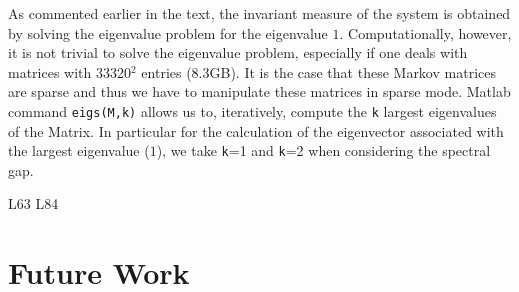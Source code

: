 As commented earlier in the text, the invariant measure of the system is obtained by solving the eigenvalue problem for the eigenvalue $1$. Computationally, however, it is not trivial to solve the eigenvalue problem, especially if one deals with matrices with 33320$^2$ entries (8.3GB). It is the case that these Markov matrices are sparse and thus we have to manipulate these matrices in sparse mode. Matlab command \texttt{eigs(M,k)} allows us to, iteratively, compute the \texttt{k} largest eigenvalues of the Matrix. In particular for the calculation of the eigenvector associated with the largest eigenvalue ($1$), we take \texttt{k}=1 and \texttt{k}=2 when considering the spectral gap.



L63
L84

\section*{Future Work}
